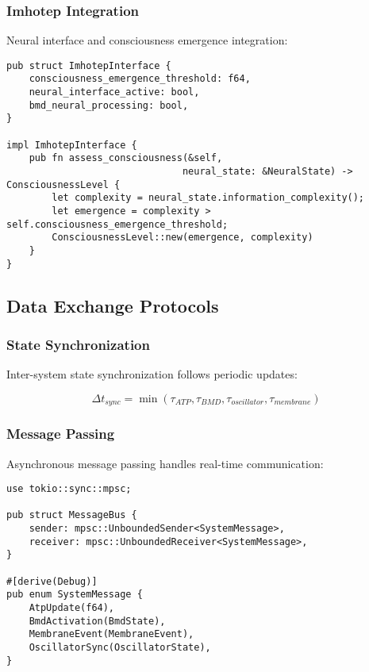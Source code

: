 \documentclass[12pt,a4paper]{article}
\begin{document}
\subsubsection{Imhotep Integration}

Neural interface and consciousness emergence integration:

\begin{lstlisting}[style=ruststyle]
pub struct ImhotepInterface {
    consciousness_emergence_threshold: f64,
    neural_interface_active: bool,
    bmd_neural_processing: bool,
}

impl ImhotepInterface {
    pub fn assess_consciousness(&self, 
                               neural_state: &NeuralState) -> ConsciousnessLevel {
        let complexity = neural_state.information_complexity();
        let emergence = complexity > self.consciousness_emergence_threshold;
        ConsciousnessLevel::new(emergence, complexity)
    }
}
\end{lstlisting}

\subsection{Data Exchange Protocols}

\subsubsection{State Synchronization}

Inter-system state synchronization follows periodic updates:

\begin{equation}
\Delta t_{sync} = \min(\tau_{ATP}, \tau_{BMD}, \tau_{oscillator}, \tau_{membrane})
\end{equation}

\subsubsection{Message Passing}

Asynchronous message passing handles real-time communication:

\begin{lstlisting}[style=ruststyle]
use tokio::sync::mpsc;

pub struct MessageBus {
    sender: mpsc::UnboundedSender<SystemMessage>,
    receiver: mpsc::UnboundedReceiver<SystemMessage>,
}

#[derive(Debug)]
pub enum SystemMessage {
    AtpUpdate(f64),
    BmdActivation(BmdState),
    MembraneEvent(MembraneEvent),
    OscillatorSync(OscillatorState),
}
\end{lstlisting}
\end{document}
